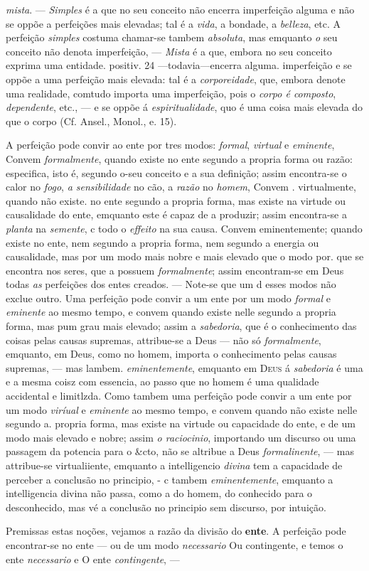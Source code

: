 \emph{mista}. --- \emph{Simples} é a que no seu conceito não encerra imperfeição alguma e não se oppõe a perfeições mais elevadas; tal é a \emph{vida}, a bondade, a \emph{belleza}, etc. A perfeição \emph{simples} costuma chamar-se tambem \emph{absoluta}, mas emquanto \emph{o} seu conceito não denota imperfeição, --- \emph{Mista} é a que, embora no seu conceito exprima uma entidade. positiv. 24 ---todavia---encerra alguma. imperfeição e se oppõe a uma perfeição mais elevada: tal é a \emph{corporeidade}, que, embora denote uma realidade, comtudo importa uma imperfeição, pois o \emph{corpo é composto}, \emph{dependente}, etc., --- e se oppõe á \emph{espiritualidade}, quo é uma coisa mais elevada do que o corpo (Cf. Ansel., Monol., e. 15).\par A perfeição pode convir ao ente por tres modos: \emph{formal}, \emph{virtual} e \emph{eminente}, Convem \emph{formalmente}, quando existe no ente segundo a propria forma ou razão: especifica, isto é, segundo o-seu conceito e a sua definição; assim encontra-se o calor no \emph{fogo}, \emph{a sensibilidade} no cão, a \emph{razão} no \emph{homem}, Convem . virtualmente, quando não existe. no ente segundo a propria forma, mas existe na virtude ou causalidade do ente, emquanto este é capaz de a produzir; assim encontra-se a \emph{planta} na \emph{semente}, c todo o \emph{effeito} na sua causa. Convem eminentemente; quando existe no ente, nem segundo a propria forma, nem segundo a energia ou causalidade, mas por um modo mais nobre e mais elevado que o modo por. que se encontra nos seres, que a possuem \emph{formalmente}; assim encontram-se em Deus todas \emph{as} perfeições dos entes creados. --- Note-se que um d esses modos não exclue outro. Uma perfeição pode convir a um ente por um modo \emph{formal} e \emph{eminente} ao mesmo tempo, e convem quando existe nelle segundo a propria forma, mas pum grau mais elevado; assim a \emph{sabedoria}, que é o conhecimento das coisas pelas causas supremas, attribue-se a Deus --- não só \emph{formalmente}, emquanto, em Deus, como no homem, importa o conhecimento pelas causas supremas, --- mas lambem. \emph{eminentemente}, emquanto em \textsc{Deus} á \emph{sabedoria} é uma e a mesma coisz com essencia, ao passo que no homem é uma qualidade accidental e limitlzda. Como tambem uma perfeição pode convir a um ente por um modo \emph{viríual} e \emph{eminente} ao mesmo tempo, e convem quando não existe nelle segundo a. propria forma, mas existe na virtude ou capacidade do ente, e de um modo mais elevado e nobre; assim \emph{o raciocinio}, importando um discurso ou uma passagem da potencia para o \&cto, não se altribue a Deus \emph{formalinente}, --- mas attribue-se virtualiiente, emquanto a intelligencio \emph{divina} tem a capacidade de perceber a conclusão no principio, - c tambem \emph{eminentemente}, emquanto a intelligencia divina não passa, como a do homem, do conhecido para o desconhecido, mas vé a conclusão no principio sem discurso, por intuição.\par Premissas estas noções, vejamos a razão da divisão do \textbf{ente}. A perfeição pode encontrar-se no ente --- ou de um modo \emph{necessario} Ou contingente, e temos o ente \emph{necessario} e O ente \emph{contingente}, --- 
